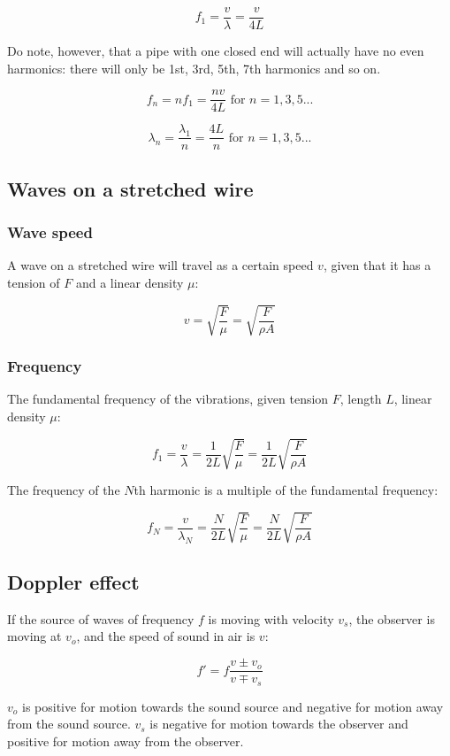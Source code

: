\documentclass[12pt]{article}
\begin{document}
\[
\boxed{
f_1 = \frac{v}{\lambda} = \frac{v}{4L}
}
\]

Do note, however, that a pipe with one closed end will actually have no even harmonics: there will only be 1st, 3rd, 5th, 7th harmonics and so on.

\[
\boxed{
f_n = nf_1 = \frac{nv}{4L}\text{ for }n = 1,3,5...
}
\]

\[
\boxed{
\lambda_n = \frac{\lambda_1}{n} = \frac{4L}{n}\text{ for }n = 1,3,5...
}
\]

\subsection{Waves on a stretched wire}

\subsubsection{Wave speed}

A wave on a stretched wire will travel as a certain speed $v$, given that it has a tension of $F$ and a linear density $\mu$:

\[
\boxed{
v = \sqrt{\frac{F}{\mu}} = \sqrt{\frac{F}{\rho A}}
}
\]

\subsubsection{Frequency}

The fundamental frequency of the vibrations, given tension $F$, length $L$, linear density $\mu$:

\[
\boxed{
f_1 = \frac{v}{\lambda} = \frac{1}{2L} \sqrt{\frac{F}{\mu}} = \frac{1}{2L} \sqrt{\frac{F}{\rho A}}
}
\]

The frequency of the $N$th harmonic is a multiple of the fundamental frequency:

\[
\boxed{
f_N = \frac{v}{\lambda_N} = \frac{N}{2L} \sqrt{\frac{F}{\mu}} = \frac{N}{2L} \sqrt{\frac{F}{\rho A}}
}
\]

\subsection{Doppler effect}

If the source of waves of frequency $f$ is moving with velocity $v_s$, the observer is moving at $v_o$, and the speed of sound in air is $v$:

\[
\boxed{
f' = f \frac{v \pm v_o}{v \mp v_s}
}
\]

$v_o$ is positive for motion towards the sound source and negative for motion away from the sound source.
$v_s$ is negative for motion towards the observer and positive for motion away from the observer.
\end{document}
